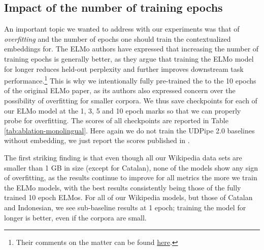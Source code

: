 \subsection{Impact of the number of training epochs}

An important topic we wanted to address with our experiments was that of \emph{overfitting} and the number of epochs one should train the contextualized embeddings for. The ELMo authors have expressed that increasing the number of training epochs is generally better, as they argue that training the ELMo model for longer reduces held-out perplexity and further improves downstream task performance.\footnote{Their comments on the matter can be found \href{https://github.com/allenai/bilm-tf/issues/135}{here}.} This is why we intentionally fully pre-trained the \elmowiki to the 10 epochs of the original ELMo paper, as its authors also expressed concern over the possibility of overfitting for smaller corpora. We thus save checkpoints for each of our ELMo model at the 1, 3, 5 and 10 epoch marks so that we can properly probe for overfitting. The scores of all checkpoints are reported in Table \ref{tab:ablation-monolingual}. Here again we do not train the UDPipe 2.0 baselines without embedding, we just report the scores published in \citet{kondratyuk-straka-2019-75}.

The first striking finding is that even though all our Wikipedia data sets are smaller than 1 GB in size (except for Catalan), none of the \elmowiki models show any sign of overfitting, as the results continue to improve for all metrics the more we train the ELMo models, with the best results consistently being those of the fully trained 10 epoch ELMos. For all of our Wikipedia models, but those of Catalan and Indonesian, we see sub-baseline results at 1 epoch; training the model for longer is better, even if the corpora are small.

